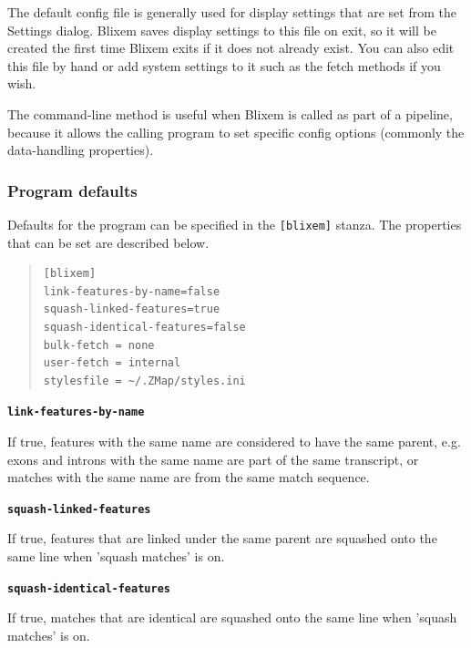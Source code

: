 \documentclass[letterpaper]{article}
\newcommand\textstyleSourceText[1]{\texttt{#1}}
\begin{document}
{The default config file is generally used for display settings that are
set from the Settings dialog. Blixem saves display settings to this
file on exit, so it will be created the first time Blixem exits if it
does not already exist. You can also edit this file by hand or add
system settings to it such as the fetch methods if you wish. }

\bigskip

{The command-line method is useful when Blixem is called as part of a
pipeline, because it allows the calling program to set specific config
options (commonly the data-handling properties). }

{\color[rgb]{0.30980393,0.5058824,0.7411765}\subsubsection[Program defaults]{Program defaults}}
\hypertarget{RefHeading37691724351149}{}{
Defaults for the program can be specified in the
\textstyleSourceText{\textrm{[blixem]}} stanza. The properties that can
be set are described below. }

\bigskip

\begin{quote}
\begin{verbatim}
[blixem]
link-features-by-name=false
squash-linked-features=true
squash-identical-features=false
bulk-fetch = none
user-fetch = internal
stylesfile = ~/.ZMap/styles.ini
\end{verbatim}
\end{quote}

{\textstyleSourceText{\textrm{\textbf{link-features-by-name}}}\textbf{ }}

{If true, features with the same name are considered to have the same
parent, e.g. exons and introns with the same name are part of the same
transcript, or matches with the same name are from the same match
sequence. }

\bigskip

{\textstyleSourceText{\textrm{\textbf{squash-linked-features}}}\textbf{ }}

{If true, features that are linked under the same parent are squashed onto the same line when 'squash matches' is on.}

\bigskip

{\textstyleSourceText{\textrm{\textbf{squash-identical-features}}}\textbf{ }}

{If true, matches that are identical are squashed onto the same line when 'squash matches' is on.}
\end{document}
